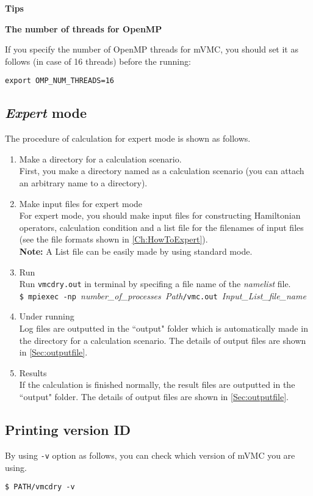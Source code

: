 \begin{screen}
\Large 
{\bf Tips}
\normalsize

{\bf The number of threads for OpenMP}

If you specify the number of OpenMP threads for mVMC,
you should set it as follows (in case of 16 threads) before the running:
\begin{verbatim}
export OMP_NUM_THREADS=16
\end{verbatim}

\end{screen}

\subsection{{\it Expert} mode}
The procedure of calculation for expert mode is shown as follows.
 \begin{enumerate}
   \item  Make a directory for a calculation scenario. \\
First, you make a directory named as a calculation scenario (you can attach an arbitrary name to a directory).
   \item  Make input files for expert mode\\
For expert mode,  you should make input files 
for constructing Hamiltonian operators, calculation condition and 
a list file for the filenames of input files (see the file formats shown in  \ref{Ch:HowToExpert}). \\
{\bf Note:} A List file can be easily made by using standard mode.
 \item  Run\\
Run \verb|vmcdry.out| in terminal by specifing
a file name of the {\it namelist} file.\\

\verb|$ mpiexec -np |\textit{number\_of\_processes}\verb| |\textit{Path}\verb|/vmc.out |\textit{Input\_List\_file\_name}

\item Under running\\
Log files are outputted in the ``output" folder which is automatically made in the directory for a calculation scenario.
The details of output files are shown in \ref{Sec:outputfile}.

\item Results\\
If the calculation is finished normally, the result files are outputted in  the ``output" folder. The details of output files are shown in \ref{Sec:outputfile}.
\end{enumerate}

\subsection{Printing version ID}

By using \verb|-v| option as follows, 
you can check which version of mVMC you are using.

\begin{verbatim}
$ PATH/vmcdry -v
\end{verbatim}
